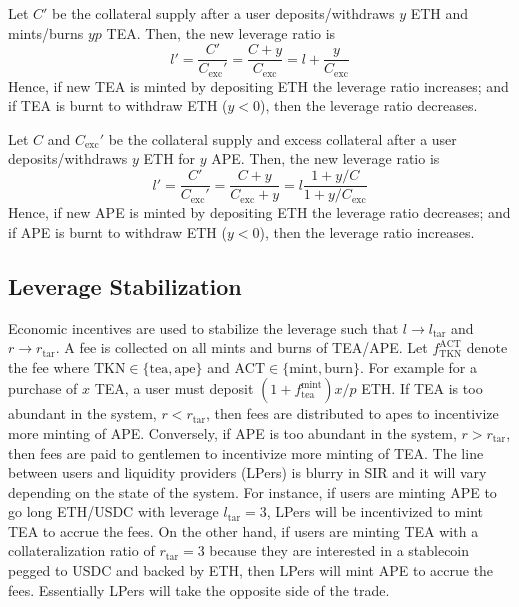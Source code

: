 \documentclass[journal,letterpaper,oneside,onecolumn,12pt]{IEEEtran}
\begin{document}
	Let $C'$ be the collateral supply after a user deposits/withdraws $y$ ETH and mints/burns $yp$ TEA. Then, the new leverage ratio is
	\begin{equation}
		l' = \frac{C'}{C_\text{exc}'} = \frac{C+y}{C_\text{exc}} = l +\frac{y}{C_\text{exc}}
	\end{equation}
	Hence, if new TEA is minted by depositing ETH the leverage ratio increases; and if TEA is burnt to withdraw ETH ($y<0$), then the leverage ratio decreases.

	Let $C$ and $C_\text{exc}'$ be the collateral supply and excess collateral after a user deposits/withdraws $y$ ETH for $y$ APE. Then, the new leverage ratio is
	\begin{equation}
		l' = \frac{C'}{C_\text{exc}'} = \frac{C+y}{C_\text{exc}+y} = l \frac{1+y/C}{1+y/C_\text{exc}}
	\end{equation}
	Hence, if new APE is minted by depositing ETH the leverage ratio decreases; and if APE is burnt to withdraw ETH ($y<0$), then the leverage ratio increases.
	
	
	
	
	\subsection{Leverage Stabilization} \label{sec:leverage:stabilization}

	Economic incentives are used to stabilize the leverage such that $l\rightarrow l_\textrm{tar}$ and $r\rightarrow r_\textrm{tar}$.
	A fee is collected on all mints and burns of TEA/APE. Let $f_\textrm{TKN}^\textrm{ACT}$ denote the fee where $\textrm{TKN}\in\{\textrm{tea},\textrm{ape}\}$ and $\textrm{ACT}\in\{\textrm{mint},\textrm{burn}\}$. For example for a purchase of $x$ TEA, a user must deposit $(1+f_\textrm{tea}^\textrm{mint})x/p$ ETH. If TEA is too abundant in the system, $r<r_\textrm{tar}$, then fees are distributed to apes to incentivize more minting of APE. Conversely, if APE is too abundant in the system, $r>r_\textrm{tar}$, then fees are paid to gentlemen to incentivize more minting of TEA. The line between users and liquidity providers (LPers) is blurry in SIR and it will vary depending on the state of the system. For instance, if users are minting APE to go long ETH/USDC with leverage $l_\textrm{tar}=3$, LPers will be incentivized to mint TEA to accrue the fees. On the other hand, if users are minting TEA with a collateralization ratio of $r_\textrm{tar}=3$ because they are interested in a stablecoin pegged to USDC and backed by ETH, then LPers will mint APE to accrue the fees. Essentially LPers will take the opposite side of the trade.
	
\end{document}
